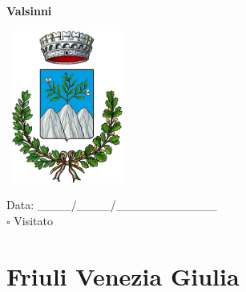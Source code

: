\documentclass[a5paper,12pt]{article}
\begin{document}
\vspace{0.7cm}

\noindent
\begin{minipage}[t]{0.45\textwidth}
    \begin{center}
        \textbf{Valsinni}
    \end{center}
    \vspace{-0.5cm} %
    \begin{center}
        \includegraphics[height= 5cm, width=4cm]{Basilicata/Valsinni-Stemma.png}
    \end{center}
    \vspace{-0.4cm} %
    \begin{flushleft}
        Data: \_\_\_\_/\_\_\_\_/\_\_\_\_\_\_\_\_\_\_\_\_ \\
        $\square$ Visitato
    \end{flushleft}
\end{minipage}

\newpage

\section*{Friuli Venezia Giulia}

\newpage
\end{document}
